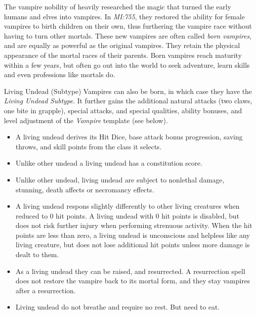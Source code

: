 The vampire nobility of  heavily researched the magic
that turned the early humans and elves into vampires. In \emph{MI:755}, they
restored the ability for female vampires to birth children on their own, thus
furthering the vampire race without having to turn other mortals. These new
vampires are often called \emph{born vampires}, and are equally as powerful
as the original vampires. They retain the physical appearance of the mortal
races of their parents. Born vampires reach maturity within a few years, but
often go out into the world to seek adventure, learn skills and even
professions like mortals do.

\begin{35e}{Living Undead (Subtype)}
  Vampires can also be born, in which case they have the \emph{Living Undead
  Subtype}. It further gains the additional natural attacks (two claws, one
  bite in grapple), special attacks, and special qualities, ability bonuses,
  and level adjustment of the \emph{Vampire} template (see below).

  \begin{itemize}[noitemsep]
    \item{A living undead derives its Hit Dice, base attack bonus progression,
      saving throws, and skill points from the class it selects.
    }
    \item{Unlike other undead a living undead has a constitution score.}
    \item{Unlike other undead, living undead are subject to nonlethal damage,
      stunning, death affects or necromancy effects.
    }
    \item{A living undead respons slightly differently to other living
      creatures when reduced to 0 hit points. A living undead with 0
      hit points is disabled, but does not risk further injury when
      performing strenuous activity. When the hit points are less than
      zero, a living undead is unconscious and helpless like any living
      creature, but does not lose additional hit points unless more damage
      is dealt to them.
    }
    \item{As a living undead they can be raised, and resurrected. A resurrection
      spell does not restore the vampire back to its mortal form, and they stay
      vampires after a resurrection.
    }
    \item{Living undead do not breathe and require no rest. But need to eat.}
  \end{itemize}
\end{35e}

